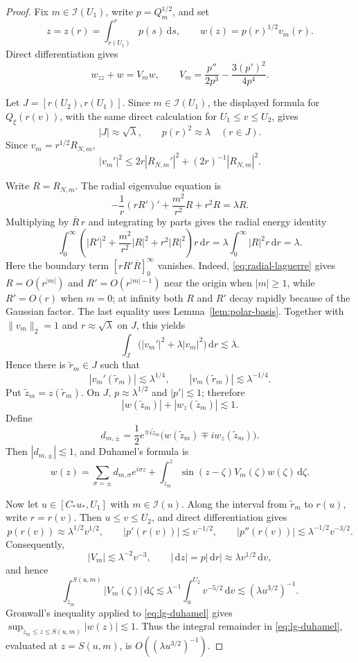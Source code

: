 \documentclass[11pt,a4paper]{amsart}
\numberwithin{equation}{section}
\newcommand{\dd}{\,\mathrm d}
\newcommand{\norm}[1]{\lVert #1\rVert}
\begin{document}
\begin{proof}
Fix \(m\in\mathcal I(U_1)\), write \(p=Q_m^{1/2}\), and set
\[
 z=z(r)=\int_{r(U_1)}^r p(s)\dd s,
 \qquad
 w(z)=p(r)^{1/2}v_m(r).
\]
Direct differentiation gives
\[
 w_{zz}+w=V_mw,
 \qquad
 V_m=\frac{p''}{2p^3}-\frac{3(p')^2}{4p^4}.
\]

Let \(J=[r(U_2),r(U_1)]\). Since \(m\in\mathcal I(U_1)\), the displayed formula for
\(Q_\xi(r(v))\), with the same direct calculation for
\(U_1\le v\le U_2\), gives
\[
 |J|\approx\sqrt\lambda,
 \qquad p(r)^2\approx\lambda\quad(r\in J).
\]
Since \(v_m=r^{1/2}R_{N,m}\),
\[
 |v_m'|^2\le2r|R_{N,m}'|^2+(2r)^{-1}|R_{N,m}|^2.
\]

 Write \(R=R_{N,m}\).
The radial eigenvalue equation is
\[
 -\frac1r(rR')'+\frac{m^2}{r^2}R+r^2R=\lambda R.
\]
Multiplying by \(\overline R\,r\) and integrating by parts gives the radial energy identity
\[
 \int_0^\infty\left(|R'|^2+\frac{m^2}{r^2}|R|^2
 +r^2|R|^2\right)r\dd r
 =\lambda\int_0^\infty|R|^2r\dd r=\lambda.
\]
Here the boundary term \([rR'\overline R]_0^\infty\) vanishes. Indeed,
\eqref{eq:radial-laguerre} gives \(R=O(r^{|m|})\) and
\(R'=O(r^{|m|-1})\) near the origin when \(|m|\ge1\), while
\(R'=O(r)\) when \(m=0\); at infinity both \(R\) and \(R'\) decay
rapidly because of the Gaussian factor. The last equality uses
Lemma~\ref{lem:polar-basis}.
Together with \(\norm{v_m}_2=1\) and \(r\approx\sqrt\lambda\) on \(J\),
this yields
\[
 \int_J\bigl(|v_m'|^2+\lambda|v_m|^2\bigr)\dd r\lesssim\lambda.
\]
Hence there is \(\tilde r_m\in J\) such that
\[
 |v_m'(\tilde r_m)|\lesssim\lambda^{1/4},
 \qquad |v_m(\tilde r_m)|\lesssim\lambda^{-1/4}.
\]
Put \(\tilde z_m=z(\tilde r_m)\). On \(J\),
\(p\approx\lambda^{1/2}\) and \(|p'|\lesssim1\); therefore
\[
 |w(\tilde z_m)|+|w_z(\tilde z_m)|\lesssim1.
\]
Define
\[
 d_{m,\pm}=\frac12e^{\mp i\tilde z_m}
 \bigl(w(\tilde z_m)\mp iw_z(\tilde z_m)\bigr).
\]
Then \(|d_{m,\pm}|\lesssim1\), and Duhamel's formula is
\begin{equation}\label{eq:lg-duhamel}
 w(z)=\sum_{\sigma=\pm}d_{m,\sigma}e^{i\sigma z}
 +\int_{\tilde z_m}^z\sin(z-\zeta)V_m(\zeta)w(\zeta)\dd\zeta.
\end{equation}

Now let \(u\in[C_*u_*,U_1]\) with \(m\in\mathcal I(u)\).
Along the interval from \(\tilde r_m\) to \(r(u)\), write \(r=r(v)\).
Then \(u\le v\le U_2\), and direct differentiation gives
\[
 p(r(v))\approx\lambda^{1/2}v^{1/2},
 \qquad |p'(r(v))|\lesssim v^{-1/2},
 \qquad |p''(r(v))|\lesssim\lambda^{-1/2}v^{-3/2}.
\]
Consequently,
\[
 |V_m|\lesssim\lambda^{-2}v^{-3},
 \qquad |\dd z|=p|\dd r|\approx\lambda v^{1/2}\dd v,
\]
and hence
\[
 \int_{\tilde z_m}^{S(u,m)}|V_m(\zeta)|\dd\zeta
 \lesssim\lambda^{-1}\int_u^{U_2}v^{-5/2}\dd v
 \lesssim(\lambda u^{3/2})^{-1}.
\]
Gronwall's inequality applied to \eqref{eq:lg-duhamel} gives
\(\sup_{\tilde z_m\le z\le S(u,m)}|w(z)|\lesssim1\). Thus the integral
remainder in \eqref{eq:lg-duhamel}, evaluated at \(z=S(u,m)\), is
\(O((\lambda u^{3/2})^{-1})\).


\end{proof}
\end{document}

